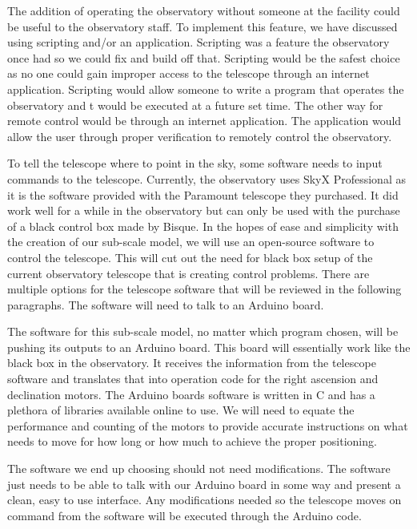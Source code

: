 \documentclass[12pt]{article}
\begin{document}
The addition of operating the observatory without someone at the facility could be useful to the observatory staff. To implement this feature, we have discussed using scripting and/or an application. Scripting was a feature the observatory once had so we could fix and build off that. Scripting would be the safest choice as no one could gain improper access to the telescope through an internet application. Scripting would allow someone to write a program that operates the observatory and t would be executed at a future set time. The other way for remote control would be through an internet application. The application would allow the user through proper verification to remotely control the observatory.

To tell the telescope where to point in the sky, some software needs to input commands to the telescope. Currently, the observatory uses SkyX Professional as it is the software provided with the Paramount telescope they purchased. It did work well for a while in the observatory but can only be used with the purchase of a black control box made by Bisque. In the hopes of ease and simplicity with the creation of our sub-scale model, we will use an open-source software to control the telescope. This will cut out the need for black box setup of the current observatory telescope that is creating control problems. There are multiple options for the telescope software that will be reviewed in the following paragraphs. The software will need to talk to an Arduino board.

The software for this sub-scale model, no matter which program chosen, will be pushing its outputs to an Arduino board. This board will essentially work like the black box in the observatory. It receives the information from the telescope software and translates that into operation code for the right ascension and declination motors. The Arduino boards software is written in C and has a plethora of libraries available online to use. We will need to equate the performance and counting of the motors to provide accurate instructions on what needs to move for how long or how much to achieve the proper positioning.

The software we end up choosing should not need modifications. The software just needs to be able to talk with our Arduino board in some way and present a clean, easy to use interface. Any modifications needed so the telescope moves on command from the software will be executed through the Arduino code.

\newpage %
\end{document}

